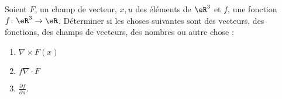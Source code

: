 
\begin{exercice}\label{exoOutilsMath-0133}

    Soient \( F\), un champ de vecteur, \( x,u\) des éléments de \( \eR^3\) et \( f\), une fonction \( f\colon \eR^3\to \eR\). Déterminer si les choses suivantes sont des vecteurs, des fonctions, des champs de vecteurs, des nombres ou autre chose :
    \begin{enumerate}
        \item
            \( \nabla\times F(x)\)
        \item
            \( f\nabla\cdot F\)
        \item
            \( \frac{ \partial f }{ \partial u }\).
    \end{enumerate}

\end{exercice}
